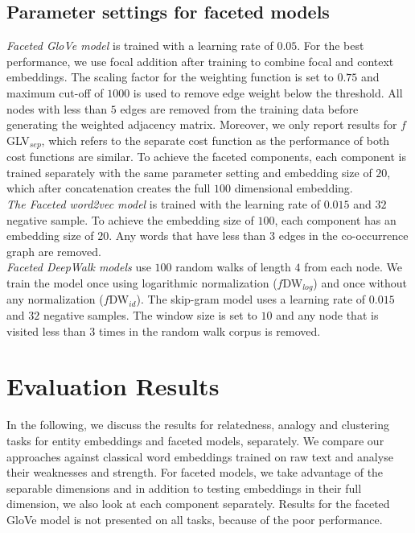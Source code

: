 \subsection{Parameter settings for faceted models}
\emph{Faceted GloVe model} is trained with a learning rate of $0.05$. For the best performance, we use focal addition after training to combine  focal and context embeddings. The scaling factor for the weighting function is set to $0.75$ and maximum cut-off of $1000$ is used to remove edge weight below the threshold. All nodes with less than $5$ edges are removed from the training data before generating the weighted adjacency matrix. Moreover, we only report results for $f$GLV$_{sep}$, which refers to the separate cost function as the performance of both cost functions are similar. To achieve the faceted components, each component is trained separately with the same parameter setting and embedding size of $20$, which after concatenation creates the full $100$ dimensional embedding. \\

\noindent
\emph{The Faceted word2vec model} is trained with the learning rate of $0.015$ and $32$ negative sample. To achieve the embedding size of $100$, each component has an embedding size of $20$. Any words that have less than $3$ edges in the co-occurrence graph are removed. \\

\noindent
\emph{Faceted DeepWalk models} use $100$ random walks of length $4$ from each node. We train the model once using logarithmic normalization ($f$DW$_{log}$) and once without any normalization ($f$DW$_{id}$). The skip-gram model uses a learning rate of $0.015$ and $32$ negative samples. The window size is set to $10$ and any node that is visited less than $3$ times in the random walk corpus is removed. 

\section{Evaluation Results}\label{sec:eval_results}
In the following, we discuss the results for relatedness, analogy and clustering tasks for entity embeddings and faceted models, separately. We compare our approaches against classical word embeddings trained on raw text and analyse their weaknesses and strength. For faceted models, we take advantage of the separable dimensions and in addition to testing embeddings in their full dimension, we also look at each component separately. Results for the faceted GloVe model is not presented on all tasks, because of the poor performance. 
